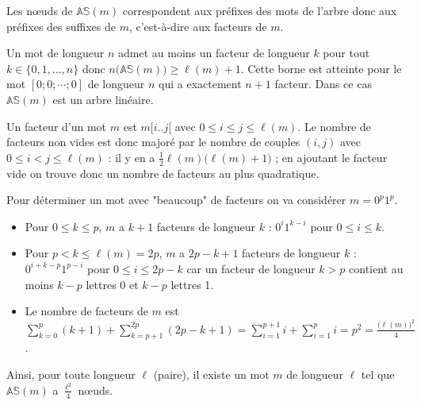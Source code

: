 \newpage
\begin{Exercise}
Les nœuds de $\mathbb{AS}(m)$ correspondent aux préfixes des mots de l'arbre donc aux préfixes des suffixes de $m$, c'est-à-dire aux facteurs de $m$.

\medskip

Un mot de longueur $n$ admet au moins un facteur de longueur $k$ pour tout $k\in \{0, 1, \ldots, n\}$ donc $n\bigl(\mathbb{AS}(m)\bigr)\ge \ell(m) +1$. Cette borne est atteinte pour le mot $[0; 0; \cdots; 0]$ de longueur $n$ qui a exactement $n+1$ facteur. Dans ce cas $\mathbb{AS}(m)$ est un arbre linéaire.

\medskip

Un facteur d'un mot $m$ est $m[i..j[$ avec $0\le i \le j \le \ell(m)$. Le nombre de facteurs non vides est donc majoré par le nombre de couples $(i,j)$ avec $0\le i < j \le \ell(m)$ : il y en a $\frac 12\ell(m)\bigl(\ell(m) + 1\bigr)$ ; en ajoutant le facteur vide on trouve donc un nombre de facteurs au plus quadratique.

Pour déterminer un mot avec "beaucoup" de facteurs on va considérer $m=0^p1^p$.

\begin{itemize}
    \item Pour $0\le k \le p$, $m$ a $k+1$ facteurs de longueur $k$ : $0^i1^{k-i}$ pour $0\le i \le k$.
    \item Pour $p< k \le \ell(m) = 2p$, $m$ a $2p-k+1$ facteurs de longueur $k$ : $0^{i+k-p}1^{p-i}$ pour $0\le i \le 2p-k$ car un facteur de longueur $k > p$ contient au moins $k-p$ lettres 0 et $k-p$ lettres 1.
    \item Le nombre de facteurs de $m$ est 
$\displaystyle \sum_{k=0}^p (k+1) +\sum_{k=p+1}^{2p} (2p-k+1)
=\sum_{i=1}^{p+1} i + \sum_{i=1}^{p}i
= p^2 = \frac{\bigl(\ell(m)\bigr)^2}4$.
\end{itemize}
Ainsi, pour toute longueur $\ell$ (paire), il existe un mot $m$ de longueur $\ell$ tel que $\mathbb{AS}(m)$ a $\frac{\ell^2}4$ nœuds.
\end{Exercise} 
